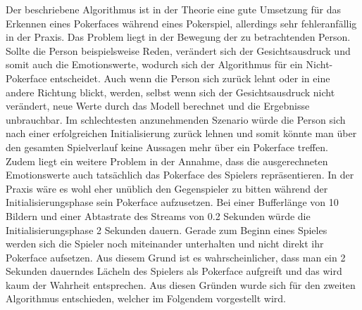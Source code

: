\documentclass[12pt, a4paper]{scrbook}
\begin{document}
\newline
Der beschriebene Algorithmus ist in der Theorie eine gute Umsetzung für das Erkennen eines Pokerfaces während eines Pokerspiel, allerdings sehr fehleranfällig in der Praxis. Das Problem liegt in der Bewegung der zu betrachtenden Person. Sollte die Person beispielsweise Reden, verändert sich der Gesichtsausdruck und somit auch die Emotionswerte, wodurch sich der Algorithmus für ein Nicht-Pokerface entscheidet. Auch wenn die Person sich zurück lehnt oder in eine andere Richtung blickt, werden, selbst wenn sich der Gesichtsausdruck nicht verändert, neue Werte durch das Modell berechnet und die Ergebnisse unbrauchbar. Im schlechtesten anzunehmenden Szenario würde die Person sich nach einer erfolgreichen Initialisierung zurück lehnen und somit könnte man über den gesamten Spielverlauf keine Aussagen mehr über ein Pokerface treffen. 
Zudem liegt ein weitere Problem in der Annahme, dass die ausgerechneten Emotionswerte auch tatsächlich das Pokerface des Spielers repräsentieren. In der Praxis wäre es wohl eher unüblich den Gegenspieler zu bitten während der Initialisierungsphase sein Pokerface aufzusetzen. Bei einer Bufferlänge von 10 Bildern und einer Abtastrate des Streams von 0.2 Sekunden würde die Initialisierungsphase 2 Sekunden dauern. Gerade zum Beginn eines Spieles werden sich die Spieler noch miteinander unterhalten und nicht direkt ihr Pokerface aufsetzen. Aus diesem Grund ist es wahrscheinlicher, dass man ein 2 Sekunden dauerndes Lächeln des Spielers als Pokerface aufgreift und das wird kaum der Wahrheit entsprechen.
Aus diesen Gründen wurde sich für den zweiten Algorithmus entschieden, welcher im Folgendem vorgestellt wird.
\end{document}
